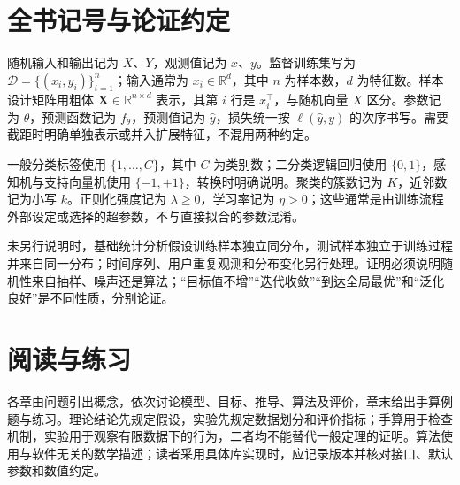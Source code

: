 \section*{全书记号与论证约定}

随机输入和输出记为 $X$、$Y$，观测值记为 $x$、$y$。监督训练集写为 $\mathcal D=\{(x_i,y_i)\}_{i=1}^{n}$；输入通常为 $x_i\in\mathbb R^d$，其中 $n$ 为样本数，$d$ 为特征数。样本设计矩阵用粗体 $\mathbf X\in\mathbb R^{n\times d}$ 表示，其第 $i$ 行是 $x_i^\top$，与随机向量 $X$ 区分。参数记为 $\theta$，预测函数记为 $f_\theta$，预测值记为 $\widehat y$，损失统一按 $\ell(\widehat y,y)$ 的次序书写。需要截距时明确单独表示或并入扩展特征，不混用两种约定。

一般分类标签使用 $\{1,\ldots,C\}$，其中 $C$ 为类别数；二分类逻辑回归使用 $\{0,1\}$，感知机与支持向量机使用 $\{-1,+1\}$，转换时明确说明。聚类的簇数记为 $K$，近邻数记为小写 $k$。正则化强度记为 $\lambda\geq0$，学习率记为 $\eta>0$；这些通常是由训练流程外部设定或选择的超参数，不与直接拟合的参数混淆。

未另行说明时，基础统计分析假设训练样本独立同分布，测试样本独立于训练过程并来自同一分布；时间序列、用户重复观测和分布变化另行处理。证明必须说明随机性来自抽样、噪声还是算法；“目标值不增”“迭代收敛”“到达全局最优”和“泛化良好”是不同性质，分别论证。

\section*{阅读与练习}

各章由问题引出概念，依次讨论模型、目标、推导、算法及评价，章末给出手算例题与练习。理论结论先规定假设，实验先规定数据划分和评价指标；手算用于检查机制，实验用于观察有限数据下的行为，二者均不能替代一般定理的证明。算法使用与软件无关的数学描述；读者采用具体库实现时，应记录版本并核对接口、默认参数和数值约定。

